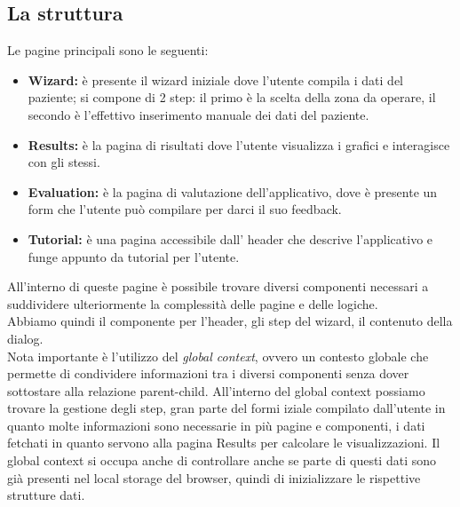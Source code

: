 \subsection{La struttura}
Le pagine principali sono le seguenti:\\ 
\begin{itemize}
    \item \textbf{Wizard:} è presente il wizard iniziale dove l'utente compila i dati del paziente; si compone di 2 step:  il primo è la scelta della zona da operare, il secondo è l'effettivo inserimento manuale dei dati del paziente.
    \item \textbf{Results:} è la pagina di risultati dove l'utente visualizza i grafici e interagisce con gli stessi.
    \item \textbf{Evaluation:} è la pagina di valutazione dell'applicativo, dove è presente un form che l'utente può compilare per darci il suo feedback. 
    \item \textbf{Tutorial:} è una pagina accessibile dall' header che descrive l'applicativo e funge appunto da tutorial per l'utente. 
\end{itemize}
All'interno di queste pagine è possibile trovare diversi componenti necessari a suddividere ulteriormente la complessità delle pagine e delle logiche.\\ 
Abbiamo quindi il componente per l'header, gli step del wizard, il contenuto della dialog.\\

Nota importante è l'utilizzo del \textit{global context}, ovvero un contesto globale che permette di condividere informazioni tra i diversi componenti senza dover sottostare alla relazione parent-child. All'interno del global context possiamo trovare la gestione degli step, gran parte del formi iziale compilato dall'utente in quanto molte informazioni sono necessarie in più pagine e componenti, i dati fetchati in quanto servono alla pagina Results per calcolare le visualizzazioni. Il global context si occupa anche di controllare anche se parte di questi dati sono già presenti nel local storage del browser, quindi di inizializzare le rispettive strutture dati.\\

